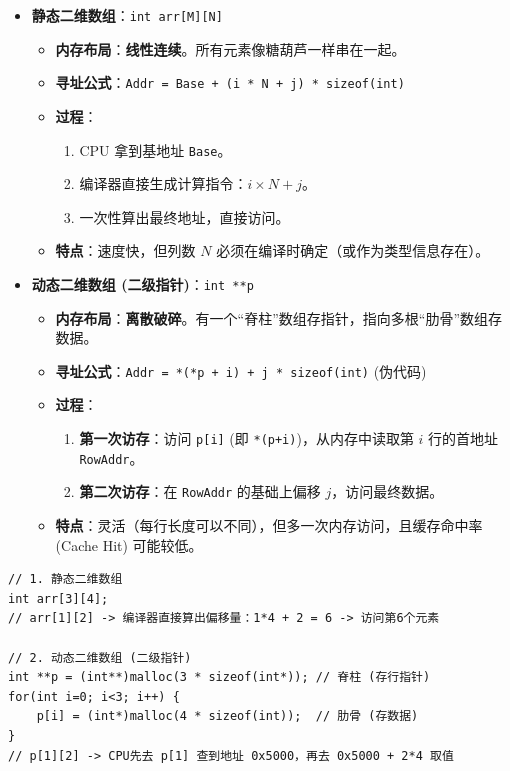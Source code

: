 \documentclass[a4paper,12pt]{article}
\begin{document}
\begin{itemize}
    \item \textbf{静态二维数组}：\texttt{int arr[M][N]}
    \begin{itemize}
        \item \textbf{内存布局}：\textbf{线性连续}。所有元素像糖葫芦一样串在一起。
        \item \textbf{寻址公式}：\texttt{Addr = Base + (i * N + j) * sizeof(int)}
        \item \textbf{过程}：
        \begin{enumerate}
            \item CPU 拿到基地址 \texttt{Base}。
            \item 编译器直接生成计算指令：$i \times N + j$。
            \item 一次性算出最终地址，直接访问。
        \end{enumerate}
        \item \textbf{特点}：速度快，但列数 $N$ 必须在编译时确定（或作为类型信息存在）。
    \end{itemize}
    
    \item \textbf{动态二维数组 (二级指针)}：\texttt{int **p}
    \begin{itemize}
        \item \textbf{内存布局}：\textbf{离散破碎}。有一个“脊柱”数组存指针，指向多根“肋骨”数组存数据。
        \item \textbf{寻址公式}：\texttt{Addr = *(*p + i) + j * sizeof(int)} (伪代码)
        \item \textbf{过程}：
        \begin{enumerate}
            \item \textbf{第一次访存}：访问 \texttt{p[i]} (即 \texttt{*(p+i)})，从内存中读取第 $i$ 行的首地址 \texttt{RowAddr}。
            \item \textbf{第二次访存}：在 \texttt{RowAddr} 的基础上偏移 $j$，访问最终数据。
        \end{enumerate}
        \item \textbf{特点}：灵活（每行长度可以不同），但多一次内存访问，且缓存命中率 (Cache Hit) 可能较低。
    \end{itemize}
\end{itemize}

\begin{lstlisting}
// 1. 静态二维数组
int arr[3][4]; 
// arr[1][2] -> 编译器直接算出偏移量：1*4 + 2 = 6 -> 访问第6个元素

// 2. 动态二维数组 (二级指针)
int **p = (int**)malloc(3 * sizeof(int*)); // 脊柱 (存行指针)
for(int i=0; i<3; i++) {
    p[i] = (int*)malloc(4 * sizeof(int));  // 肋骨 (存数据)
}
// p[1][2] -> CPU先去 p[1] 查到地址 0x5000，再去 0x5000 + 2*4 取值
\end{lstlisting}
\end{document}
